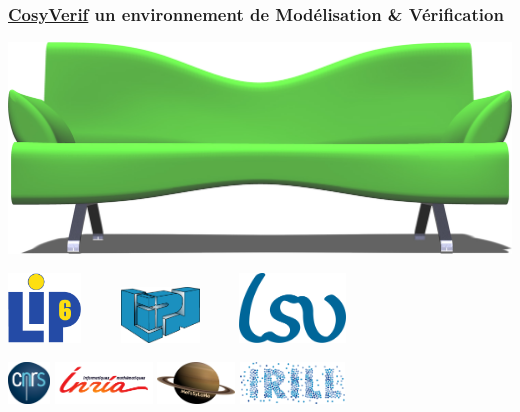 \documentclass[french]{beamer}
\begin{document}
\begin{frame}
  \frametitle{\href{http://cosyverif.org}{CosyVerif}
  un environnement de Modélisation \& Vérification}
  \begin{center}
  \includegraphics[width=.9\textwidth]{images/cosyverif.png}

  \smallskip

  \includegraphics[height=5em]{images/lip6.pdf}~~~~~
  \includegraphics[height=4em]{images/lipn.pdf}~~~~~
  \includegraphics[height=5em]{images/lsv.pdf}

  \smallskip

  \includegraphics[height=3em]{images/cnrs.png}
  \includegraphics[height=3em]{images/inria.png}
  \includegraphics[height=3em]{images/mefosyloma.png}
  \includegraphics[height=3em]{images/irill.png}
  \end{center}  
\end{frame}
\end{document}
